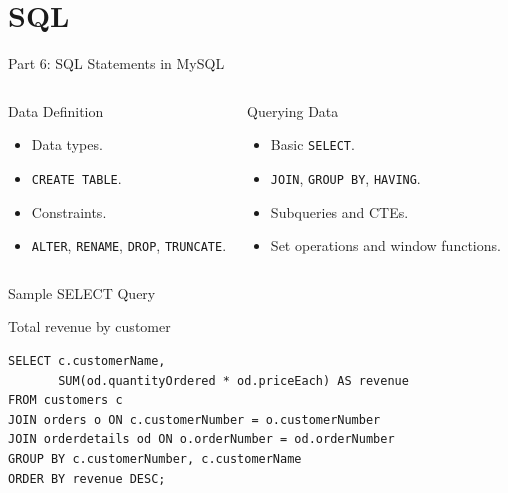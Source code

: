\documentclass[aspectratio=169,11pt]{beamer}
\begin{document}
\section{SQL}
\begin{frame}{Part 6: SQL Statements in MySQL}
\begin{columns}[T,onlytextwidth]
\begin{block}{Data Definition}
\begin{itemize}
  \item Data types.
  \item \texttt{CREATE TABLE}.
  \item Constraints.
  \item \texttt{ALTER}, \texttt{RENAME}, \texttt{DROP}, \texttt{TRUNCATE}.
\end{itemize}
\end{block}
\begin{block}{Querying Data}
\begin{itemize}
  \item Basic \texttt{SELECT}.
  \item \texttt{JOIN}, \texttt{GROUP BY}, \texttt{HAVING}.
  \item Subqueries and CTEs.
  \item Set operations and window functions.
\end{itemize}
\end{block}
\end{columns}
\end{frame}

\begin{frame}[fragile]{Sample SELECT Query}
\begin{block}{Total revenue by customer}
\begin{verbatim}
SELECT c.customerName,
       SUM(od.quantityOrdered * od.priceEach) AS revenue
FROM customers c
JOIN orders o ON c.customerNumber = o.customerNumber
JOIN orderdetails od ON o.orderNumber = od.orderNumber
GROUP BY c.customerNumber, c.customerName
ORDER BY revenue DESC;
\end{verbatim}
\end{block}
\end{frame}
\end{document}
